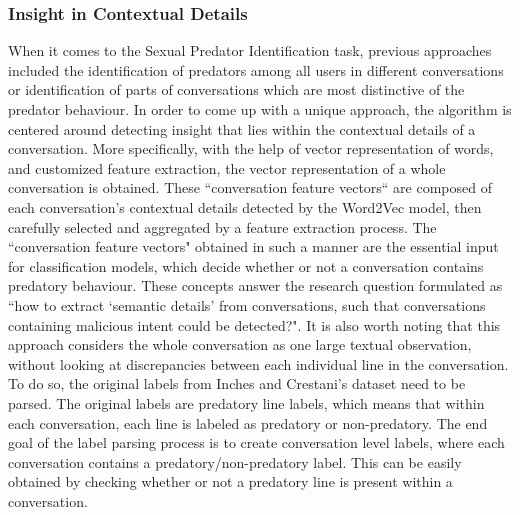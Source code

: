 \documentclass[11pt]{article}
\begin{document}
\subsubsection{Insight in Contextual Details}
When it comes to the Sexual Predator Identification task, previous approaches included the identification of predators among all users in different conversations or identification of parts of conversations which are most distinctive of the predator behaviour. In order to come up with a unique approach, the algorithm is centered around detecting insight that lies within the contextual details of a conversation. More specifically, with the help of vector representation of words, and customized feature extraction, the vector representation of a whole conversation is obtained. These ``conversation feature vectors`` are composed of each conversation's contextual details detected by the Word2Vec model, then carefully selected and aggregated by a feature extraction process. The ``conversation feature vectors" obtained in such a manner are the essential input for classification models, which decide whether or not a conversation contains predatory behaviour. These concepts answer the research question formulated as ``how to extract ‘semantic details’ from conversations, such that conversations containing malicious intent could be detected?". It is also worth noting that this approach considers the whole conversation as one large textual observation, without looking at discrepancies between each individual line in the conversation. To do so, the original labels from Inches and Crestani's dataset need to be parsed. The original labels are predatory line labels, which means that within each conversation, each line is labeled as predatory or non-predatory. The end goal of the label parsing process is to create conversation level labels, where each conversation contains a predatory/non-predatory label. This can be easily obtained by checking whether or not a predatory line is present within a conversation.

\end{document}
